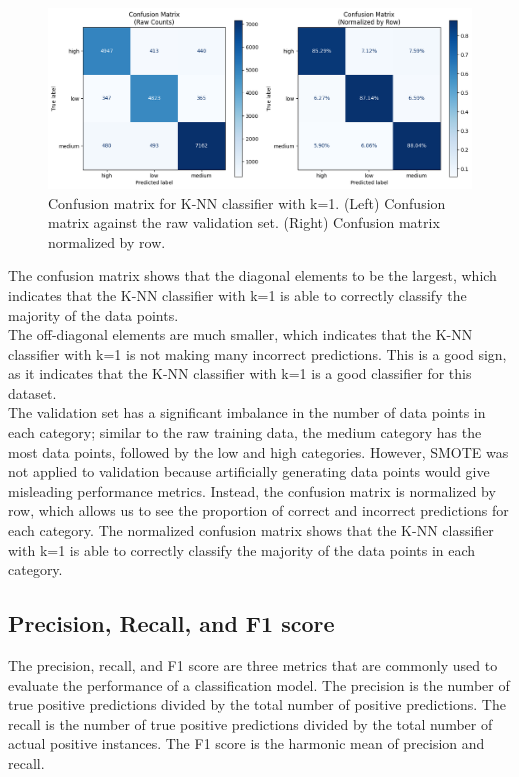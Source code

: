 \documentclass[12pt]{article}
\begin{document}
\begin{figure}[h!]
\centering
\includegraphics[width=1\textwidth]{figures/knn_confusion_matrix.png}
\caption{Confusion matrix for K-NN classifier with k=1. (Left) Confusion matrix against the raw validation set. (Right) Confusion matrix normalized by row.}
\label{fig:knn_confusion_matrix}
\end{figure}

The confusion matrix shows that the diagonal elements to be the largest, which indicates that the K-NN classifier with k=1 is able to correctly classify the majority of the data points.
\\
The off-diagonal elements are much smaller, which indicates that the K-NN classifier with k=1 is not making many incorrect predictions. This is a good sign, as it indicates that the K-NN classifier with k=1 is a good classifier for this dataset.
\\
The validation set has a significant imbalance in the number of data points in each category; similar to the raw training data, the medium category has the most data points, followed by the low and high categories. However, SMOTE was not applied to validation because artificially generating data points would give misleading performance metrics. Instead, the confusion matrix is normalized by row, which allows us to see the proportion of correct and incorrect predictions for each category. The normalized confusion matrix shows that the K-NN classifier with k=1 is able to correctly classify the majority of the data points in each category.
\\

\subsection{Precision, Recall, and F1 score}
\noindent
The precision, recall, and F1 score are three metrics that are commonly used to evaluate the performance of a classification model. The precision is the number of true positive predictions divided by the total number of positive predictions. The recall is the number of true positive predictions divided by the total number of actual positive instances. The F1 score is the harmonic mean of precision and recall.
\end{document}
